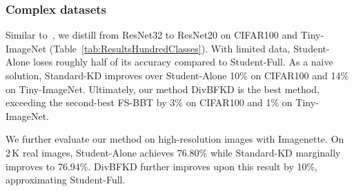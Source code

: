 \subsubsection{Complex datasets} \label{sec:experiments-complex-datasets}
\begin{foldable}
  Similar to~\cite{wang2020neural,nguyen2022black,kong2020learning}, we distill from ResNet32 to ResNet20 on CIFAR100 and Tiny-ImageNet (Table~\ref{tab:ResultsHundredClasses}).
  With limited data, Student-Alone loses roughly half of its accuracy compared to Student-Full.
  As a naive solution, Standard-KD improves over Student-Alone 10\% on CIFAR100 and 14\% on Tiny-ImageNet.
  Ultimately, our method DivBFKD is the best method, exceeding the second-best FS-BBT by 3\% on CIFAR100 and 1\% on Tiny-ImageNet.
\end{foldable}

\begin{foldable}
  We further evaluate our method on high-resolution images with Imagenette.
  On 2\,K real images, Student-Alone achieves 76.80\% while Standard-KD marginally improves to 76.94\%.
  DivBFKD further improves upon this result by 10\%, approximating Student-Full.
\end{foldable}

